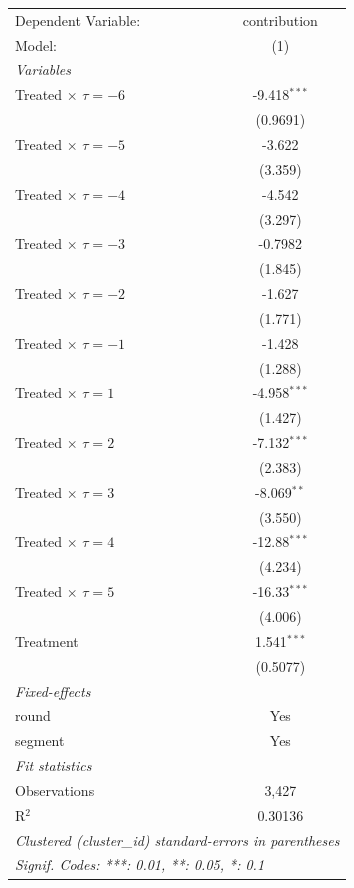 
\begingroup
\centering
\begin{tabular}{lc}
   \tabularnewline \midrule \midrule
   Dependent Variable:            & contribution\\  
   Model:                         & (1)\\  
   \midrule
   \emph{Variables}\\
   Treated $\times$ $\tau = -6$   & -9.418$^{***}$\\   
                                  & (0.9691)\\   
   Treated $\times$ $\tau = -5$   & -3.622\\   
                                  & (3.359)\\   
   Treated $\times$ $\tau = -4$   & -4.542\\   
                                  & (3.297)\\   
   Treated $\times$ $\tau = -3$   & -0.7982\\   
                                  & (1.845)\\   
   Treated $\times$ $\tau = -2$   & -1.627\\   
                                  & (1.771)\\   
   Treated $\times$ $\tau = -1$   & -1.428\\   
                                  & (1.288)\\   
   Treated $\times$ $\tau = 1$    & -4.958$^{***}$\\   
                                  & (1.427)\\   
   Treated $\times$ $\tau = 2$    & -7.132$^{***}$\\   
                                  & (2.383)\\   
   Treated $\times$ $\tau = 3$    & -8.069$^{**}$\\   
                                  & (3.550)\\   
   Treated $\times$ $\tau = 4$    & -12.88$^{***}$\\   
                                  & (4.234)\\   
   Treated $\times$ $\tau = 5$    & -16.33$^{***}$\\   
                                  & (4.006)\\   
   Treatment                      & 1.541$^{***}$\\   
                                  & (0.5077)\\   
   \midrule
   \emph{Fixed-effects}\\
   round                          & Yes\\  
   segment                        & Yes\\  
   \midrule
   \emph{Fit statistics}\\
   Observations                   & 3,427\\  
   R$^2$                          & 0.30136\\  
   \midrule \midrule
   \multicolumn{2}{l}{\emph{Clustered (cluster\_id) standard-errors in parentheses}}\\
   \multicolumn{2}{l}{\emph{Signif. Codes: ***: 0.01, **: 0.05, *: 0.1}}\\
\end{tabular}
\par\endgroup


